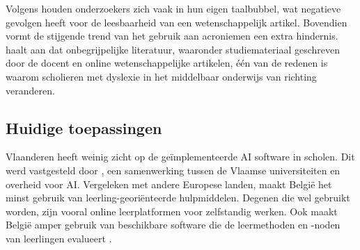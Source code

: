 

Volgens \textcite{PlavenSigray2017} houden onderzoekers zich vaak in hun eigen taalbubbel, wat negatieve gevolgen heeft voor de leesbaarheid van een wetenschappelijk artikel. Bovendien vormt de stijgende trend van het gebruik aan acroniemen \textcite{Barnett2020} een extra hindernis. \textcite{Donato2022} haalt aan dat onbegrijpelijke literatuur, waaronder studiemateriaal geschreven door de docent en online wetenschappelijke artikelen, één van de redenen is waarom scholieren met dyslexie in het middelbaar onderwijs van richting veranderen.

\subsection{Huidige toepassingen}

Vlaanderen heeft weinig zicht op de geïmplementeerde AI software in scholen. Dit werd vastgesteld door \autocite{Martens2021}, een samenwerking tussen de Vlaamse universiteiten en overheid voor AI. Vergeleken met andere Europese landen, maakt België het minst gebruik van leerling-georiënteerde hulpmiddelen. Degenen die wel gebruikt worden, zijn vooral online leerplatformen voor zelfstandig werken. Ook maakt België amper gebruik van beschikbare software die de leermethoden en -noden van leerlingen evalueert \autocite{Martens2021a}. 

